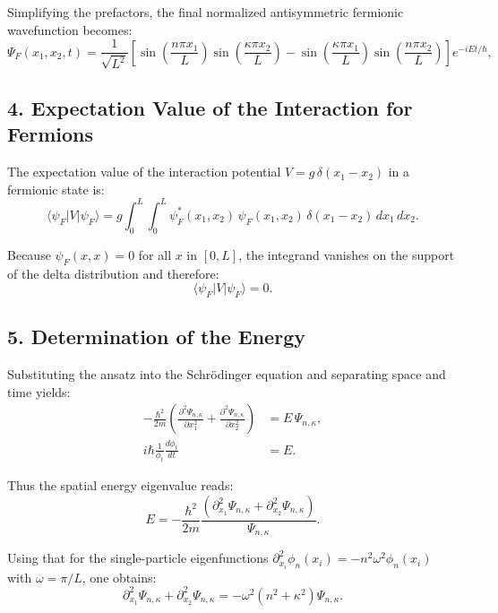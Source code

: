 Simplifying the prefactors, the final normalized antisymmetric fermionic wavefunction becomes:
\begin{equation}
	\Psi_F(x_1, x_2, t) =
	\frac{1}{\sqrt{L^2}}
	\left[
		\sin\left(\frac{n\pi x_1}{L}\right)\sin\left(\frac{\kappa\pi x_2}{L}\right)
		- \sin\left(\frac{\kappa\pi x_1}{L}\right)\sin\left(\frac{n\pi x_2}{L}\right)
	\right]
	e^{-iEt/\hbar},
\end{equation}

\subsection*{4. Expectation Value of the Interaction for Fermions}

The expectation value of the interaction potential $V = g\,\delta(x_1 - x_2)$ in a fermionic state is:
\begin{equation}
	\langle \psi_F | V | \psi_F \rangle = g\int_{0}^{L}\int_{0}^{L} \psi_F^{*}(x_1, x_2)\,\psi_F(x_1, x_2)\,\delta(x_1 - x_2)\,dx_1\,dx_2.
\end{equation}

Because $\psi_F(x,x)=0$ for all $x$ in $[0,L]$, the integrand vanishes on the support of the delta distribution and therefore:
\begin{equation}
	\langle \psi_F | V | \psi_F \rangle = 0.
\end{equation}

\subsection*{5. Determination of the Energy}

Substituting the ansatz into the Schr\"odinger equation and separating space and time yields:
\begin{align}
	-\frac{\hbar^{2}}{2m}\left(\frac{\partial^{2}\Psi_{n,\kappa}}{\partial x_1^{2}} + \frac{\partial^{2}\Psi_{n,\kappa}}{\partial x_2^{2}}\right) &= E\,\Psi_{n,\kappa}, \\
	i\hbar \frac{1}{\phi_t}\frac{d\phi_t}{dt} &= E.
\end{align}

Thus the spatial energy eigenvalue reads:
\begin{equation}
	E = -\frac{\hbar^{2}}{2m}\frac{\left(\partial_{x_1}^{2}\Psi_{n,\kappa} + \partial_{x_2}^{2}\Psi_{n,\kappa}\right)}{\Psi_{n,\kappa}}.
\end{equation}

Using that for the single-particle eigenfunctions $\partial_{x_i}^{2}\phi_n(x_i) = -n^{2}\omega^{2}\phi_n(x_i)$ with $\omega = \pi/L$, one obtains:
\begin{equation}
	\partial_{x_1}^{2}\Psi_{n,\kappa} + \partial_{x_2}^{2}\Psi_{n,\kappa} = -\omega^{2}(n^{2} + \kappa^{2})\Psi_{n,\kappa}.
\end{equation}

